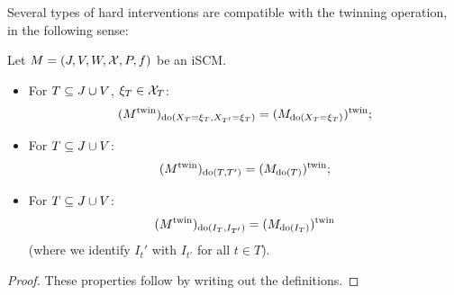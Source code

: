 Several types of hard interventions are compatible with the twinning operation, in the following sense:
\begin{Prp}\label{prp:hard_interventions_twin_scm}
Let $M = \left ( J, V, W, \mathcal{X}, P, f \right )$ be an iSCM.
\begin{itemize}
  \item For $T \subseteq J \cup V$, $\xi_T \in \mathcal{X}_{T}$:
    $$(M^{\mathrm{twin}})_{\operatorname{do}(X_T=\xi_T,X_{T'}=\xi_T)} = (M_{\operatorname{do}(X_{T}=\xi_T)})^{\mathrm{twin}};$$
  \item For $T \subseteq J \cup V$:
    $$(M^{\mathrm{twin}})_{\operatorname{do}(T,T')} = (M_{\operatorname{do}(T)})^{\mathrm{twin}};$$
  \item For $T \subseteq J \cup V$:
    $$(M^{\mathrm{twin}})_{\operatorname{do}(I_T,I_{T'})} = (M_{\operatorname{do}(I_T)})^{\mathrm{twin}}$$
    (where we identify $I_t'$ with $I_{t'}$ for all $t \in T$). 
\end{itemize}
\end{Prp}
\begin{proof}
  These properties follow by writing out the definitions.
\end{proof}

